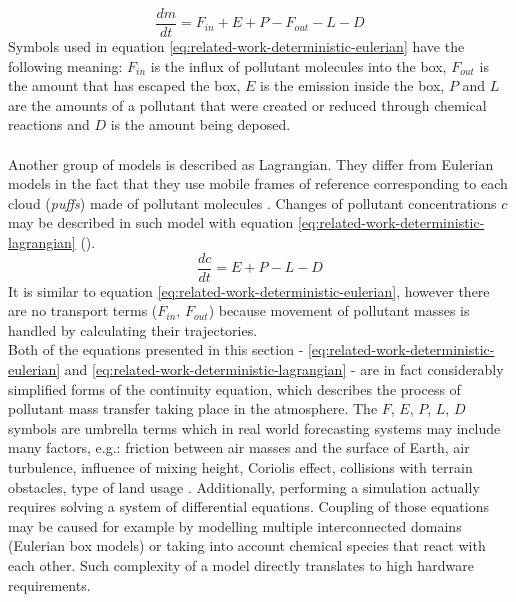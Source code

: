 \begin{equation} \label{eq:related-work-deterministic-eulerian}
    \frac{dm}{dt} = F_{in} + E + P - F_{out} - L - D
\end{equation}
Symbols used in equation \ref{eq:related-work-deterministic-eulerian} have the following meaning: $F_{in}$ is the influx of pollutant molecules into the box, $F_{out}$ is the amount that has escaped the box, $E$ is the emission inside the box, $P$ and $L$ are the amounts of a pollutant that were created or reduced through chemical reactions and $D$ is the amount being deposed.
\\\\
Another group of models is described as Lagrangian. They differ from Eulerian models in the fact that they use mobile frames of reference corresponding to each cloud (\textit{puffs}) made of pollutant molecules \cite{MCMURRY2004}. Changes of pollutant concentrations $c$ may be described in such model with equation \ref{eq:related-work-deterministic-lagrangian} (\cite{JACOBI1999}).
\begin{equation} \label{eq:related-work-deterministic-lagrangian}
    \frac{dc}{dt} = E + P - L - D
\end{equation}
It is similar to equation \ref{eq:related-work-deterministic-eulerian}, however there are no transport terms ($F_{in}$, $F_{out}$) because movement of pollutant masses is handled by calculating their trajectories.
\\
Both of the equations presented in this section - \ref{eq:related-work-deterministic-eulerian} and \ref{eq:related-work-deterministic-lagrangian} - are in fact considerably simplified forms of the continuity equation, which describes the process of pollutant mass transfer taking place in the atmosphere. The $F$, $E$, $P$, $L$, $D$ symbols are umbrella terms which in real world forecasting systems may include many factors, e.g.: friction between air masses and the surface of Earth, air turbulence, influence of mixing height, Coriolis effect, collisions with terrain obstacles, type of land usage \cite{JACOBI1999} \cite{MCMURRY2004}. Additionally, performing a simulation actually requires solving a system of differential equations. Coupling of those equations may be caused for example by modelling multiple interconnected domains (Eulerian box models) or taking into account chemical species that react with each other. Such complexity of a model directly translates to high hardware requirements.
\\\\
